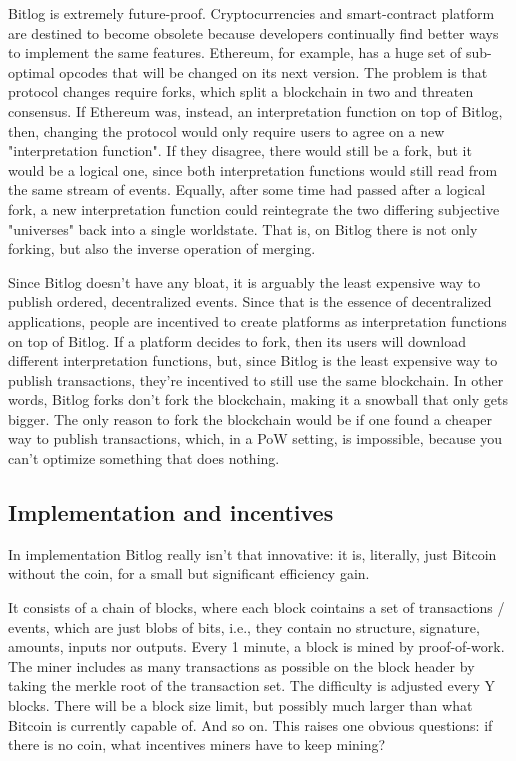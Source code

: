 \documentclass{article}
\theoremstyle{definition}
\theoremstyle{theorem}
\begin{document}
Bitlog is extremely future-proof. Cryptocurrencies and smart-contract platform
are destined to become obsolete because developers continually find better ways
to implement the same features. Ethereum, for example, has a huge set of
sub-optimal opcodes that will be changed on its next version. The problem is
that protocol changes require forks, which split a blockchain in two and
threaten consensus. If Ethereum was, instead, an interpretation function on top
of Bitlog, then, changing the protocol would only require users to agree on a
new "interpretation function". If they disagree, there would still be a fork,
but it would be a logical one, since both interpretation functions would still
read from the same stream of events. Equally, after some time had passed after a
logical fork, a new interpretation function could reintegrate the two differing
subjective "universes" back into a single worldstate. That is, on Bitlog there
is not only forking, but also the inverse operation of merging.

Since Bitlog doesn't have any bloat, it is arguably the least expensive way to
publish ordered, decentralized events. Since that is the essence of
decentralized applications, people are incentived to create platforms as
interpretation functions on top of Bitlog. If a platform decides to fork, then
its users will download different interpretation functions, but, since Bitlog is
the least expensive way to publish transactions, they're incentived to still use
the same blockchain. In other words, Bitlog forks don't fork the blockchain,
making it a snowball that only gets bigger. The only reason to fork the
blockchain would be if one found a cheaper way to publish transactions, which,
in a PoW setting, is impossible, because you can't optimize something that does
nothing.

\subsection{Implementation and incentives}

In implementation Bitlog really isn't that innovative: it is, literally, just
Bitcoin without the coin, for a small but significant efficiency gain. 

It consists of a chain of blocks, where each block cointains a set of
transactions / events, which are just blobs of bits, i.e., they contain no
structure, signature, amounts, inputs nor outputs. Every 1 minute, a block is
mined by proof-of-work. The miner includes as many transactions as possible on
the block header by taking the merkle root of the transaction set. The
difficulty is adjusted every Y blocks.  There will be a block size limit, but
possibly much larger than what Bitcoin is currently capable of. And so on. This
raises one obvious questions: if there is no coin, what incentives miners have
to keep mining?
\end{document}
